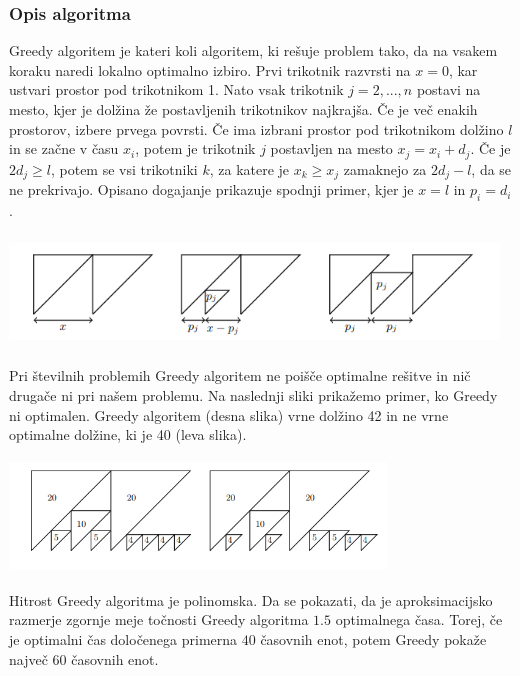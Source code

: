 \documentclass[a4paper,12pt]{article}
\theoremstyle{definition}
\theoremstyle{plain}
\begin{document}
\subsubsection{Opis algoritma}
Greedy algoritem je kateri koli algoritem, ki rešuje problem tako, da na vsakem koraku naredi lokalno optimalno izbiro. Prvi trikotnik razvrsti na $x=0$, kar ustvari prostor pod trikotnikom 1.
Nato vsak trikotnik $j=2,...,n$ postavi na mesto, kjer je dolžina že postavljenih trikotnikov najkrajša. Če je več enakih prostorov, izbere prvega povrsti.
Če ima izbrani prostor pod trikotnikom dolžino $l$ in se začne v času $x_i$, potem je trikotnik $j$ postavljen na mesto $x_j=x_i+d_j$. Če je $2d_j \ge l$,  potem se vsi trikotniki $k$, za katere je $x_k \ge x_j$ zamaknejo za $ 2d_j-l$, da se ne prekrivajo. Opisano 
dogajanje prikazuje spodnji primer, kjer je $x=l$ in $ p_i = d_i $.
\begin{center}
    \includegraphics[width=13cm, height=3cm]{greedy.png} 
 \end{center}
Pri številnih problemih Greedy algoritem ne poišče optimalne rešitve in nič drugače ni pri našem problemu.
Na naslednji sliki prikažemo primer, ko Greedy ni optimalen. Greedy algoritem (desna slika) vrne dolžino 42 in ne vrne optimalne dolžine, ki je 40 (leva slika).
\begin{center}
    \includegraphics[width=10cm, height=3cm]{primer_neoptimalnosti_greedy.png} 
 \end{center}
Hitrost Greedy algoritma je polinomska. Da se pokazati, da je aproksimacijsko razmerje zgornje meje točnosti Greedy algoritma $1.5$ optimalnega časa. Torej, če je optimalni čas določenega primerna
$40$ časovnih enot, potem Greedy pokaže največ $60$ časovnih enot.

\newpage
\end{document}
